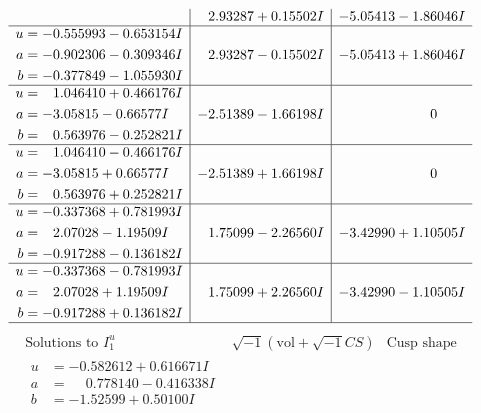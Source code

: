 \documentclass[1p]{elsarticle_modified}
\theoremstyle{definition}
\newcommand{\I}{\sqrt{-1}}
\begin{document}
$$\begin{array}{c|c|c}
 & \phantom{-}2.93287 + 0.15502 I & -5.05413 - 1.86046 I \\ \hline\begin{aligned}
u &= -0.555993 - 0.653154 I \\
a &= -0.902306 - 0.309346 I \\
b &= -0.377849 - 1.055930 I\end{aligned}
 & \phantom{-}2.93287 - 0.15502 I & -5.05413 + 1.86046 I \\ \hline\begin{aligned}
u &= \phantom{-}1.046410 + 0.466176 I \\
a &= -3.05815 - 0.66577 I \\
b &= \phantom{-}0.563976 - 0.252821 I\end{aligned}
 & -2.51389 - 1.66198 I & \phantom{-0.000000 } 0 \\ \hline\begin{aligned}
u &= \phantom{-}1.046410 - 0.466176 I \\
a &= -3.05815 + 0.66577 I \\
b &= \phantom{-}0.563976 + 0.252821 I\end{aligned}
 & -2.51389 + 1.66198 I & \phantom{-0.000000 } 0 \\ \hline\begin{aligned}
u &= -0.337368 + 0.781993 I \\
a &= \phantom{-}2.07028 - 1.19509 I \\
b &= -0.917288 - 0.136182 I\end{aligned}
 & \phantom{-}1.75099 - 2.26560 I & -3.42990 + 1.10505 I \\ \hline\begin{aligned}
u &= -0.337368 - 0.781993 I \\
a &= \phantom{-}2.07028 + 1.19509 I \\
b &= -0.917288 + 0.136182 I\end{aligned}
 & \phantom{-}1.75099 + 2.26560 I & -3.42990 - 1.10505 I\\
 \hline 
 \end{array}$$\newpage$$\begin{array}{c|c|c}  
\text{Solutions to }I^u_{1}& \I (\text{vol} + \sqrt{-1}CS) & \text{Cusp shape}\\
 \hline 
\begin{aligned}
u &= -0.582612 + 0.616671 I \\
a &= \phantom{-}0.778140 - 0.416338 I \\
b &= -1.52599 + 0.50100 I\end{aligned}

\end{array}$$
\end{document}
